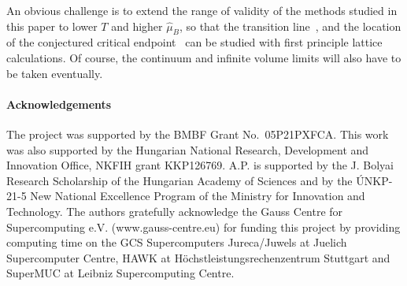 \documentclass[twocolumn,showpacs,preprintnumbers,amsmath,amssymb,latexsym,prl,footinbib,floatfix,superscriptaddress]{revtex4-2}
\begin{document}
An obvious challenge is to 
extend the range of validity of the methods studied in this paper 
to lower $T$ and higher $\hat{\mu}_B$, so that the transition 
line~\cite{Bonati:2018nut,HotQCD:2018pds,Borsanyi:2020fev,Pasztor:2020dur,Haque:2020eyj}, 
and the location of the conjectured critical 
endpoint~\cite{Fukushima:2008wg,Kovacs:2016juc,Isserstedt:2019pgx,Gao:2020fbl,Bernhardt:2021iql}
can be studied with first principle lattice calculations.
Of course, the continuum and infinite volume limits will 
also have to be taken eventually.

\paragraph{Acknowledgements}
The project was supported by the BMBF Grant No.~05P21PXFCA.
This work was also supported by the Hungarian National Research,
Development and Innovation Office, NKFIH grant KKP126769.
A.P. is supported by the J. Bolyai Research
Scholarship of the Hungarian Academy of Sciences and by the \'UNKP-21-5 New
National Excellence Program of the Ministry for Innovation and Technology.
The authors gratefully acknowledge the Gauss Centre for Supercomputing
e.V. (www.gauss-centre.eu) for funding this project by providing computing
time on the GCS Supercomputers Jureca/Juwels at Juelich Supercomputer Centre, HAWK at
H\"ochstleistungsrechenzentrum Stuttgart and SuperMUC at Leibniz
Supercomputing Centre.
\newpage

%
%

\end{document}
